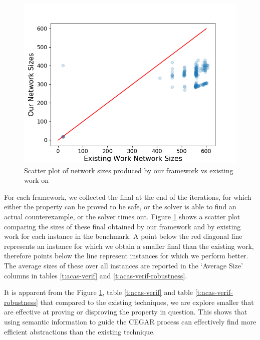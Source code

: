 \begin{figure}
    \vspace*{-0.5cm}
    \includegraphics[scale=0.4]{figs/scatter-cegar-our-nerualsat-diag-new.png}
    \vspace{0.15cm}
    \caption{Scatter plot of network sizes produced by our framework vs existing
    work \cite{cegar-nn} on \acasxu }
    \label{f:scatter-netsizes}
    \vspace*{-0.5cm}
\end{figure}

For each framework, we collected the final \abs at the end of the \cegar
iterations, for which either the property can be proved to be safe, or 
the solver is able to find an actual counterexample, or the solver times out.  
Figure \ref{f:scatter-netsizes} shows a scatter plot comparing the sizes of
these final \abs obtained by our framework and by existing work \cite{cegar-nn}
for each instance in the benchmark.
A point below the red diagonal line represents an instance for which we obtain a
smaller final \abs than the existing work, therefore points below the line
represent instances for which we perform better.
The average sizes of these \abs over all instances are
reported in the `Average Size' columns in tables \ref{t:acas-verif} and
\ref{t:acas-verif-robustness}. 

It is apparent from the Figure \ref{f:scatter-netsizes}, 
table \ref{t:acas-verif} and table \ref{t:acas-verif-robustness} that compared 
to the existing techniques, we are explore smaller \abs that are effective 
at proving or disproving the property in question.
This shows that using semantic information to guide the CEGAR process can
effectively find more efficient abstractions than the existing technique.

